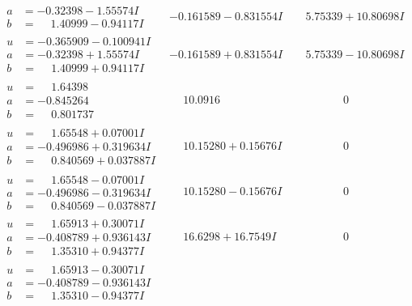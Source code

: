 \documentclass[1p]{elsarticle_modified}
\theoremstyle{definition}
\begin{document}
$$\begin{array}{c|c|c}
\begin{aligned}
a &= -0.32398 - 1.55574 I \\
b &= \phantom{-}1.40999 - 0.94117 I\end{aligned}
 & -0.161589 - 0.831554 I & \phantom{-}5.75339 + 10.80698 I \\ \hline\begin{aligned}
u &= -0.365909 - 0.100941 I \\
a &= -0.32398 + 1.55574 I \\
b &= \phantom{-}1.40999 + 0.94117 I\end{aligned}
 & -0.161589 + 0.831554 I & \phantom{-}5.75339 - 10.80698 I \\ \hline\begin{aligned}
u &= \phantom{-}1.64398\phantom{ +0.000000I} \\
a &= -0.845264\phantom{ +0.000000I} \\
b &= \phantom{-}0.801737\phantom{ +0.000000I}\end{aligned}
 & \phantom{-}10.0916\phantom{ +0.000000I} & \phantom{-0.000000 } 0 \\ \hline\begin{aligned}
u &= \phantom{-}1.65548 + 0.07001 I \\
a &= -0.496986 + 0.319634 I \\
b &= \phantom{-}0.840569 + 0.037887 I\end{aligned}
 & \phantom{-}10.15280 + 0.15676 I & \phantom{-0.000000 } 0 \\ \hline\begin{aligned}
u &= \phantom{-}1.65548 - 0.07001 I \\
a &= -0.496986 - 0.319634 I \\
b &= \phantom{-}0.840569 - 0.037887 I\end{aligned}
 & \phantom{-}10.15280 - 0.15676 I & \phantom{-0.000000 } 0 \\ \hline\begin{aligned}
u &= \phantom{-}1.65913 + 0.30071 I \\
a &= -0.408789 + 0.936143 I \\
b &= \phantom{-}1.35310 + 0.94377 I\end{aligned}
 & \phantom{-}16.6298 + 16.7549 I & \phantom{-0.000000 } 0 \\ \hline\begin{aligned}
u &= \phantom{-}1.65913 - 0.30071 I \\
a &= -0.408789 - 0.936143 I \\
b &= \phantom{-}1.35310 - 0.94377 I\end{aligned}

\end{array}$$
\end{document}
